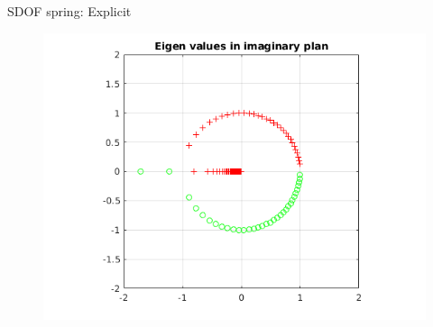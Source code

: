 \begin{frame}{SDOF spring: Explicit}
\begin{figure}[ht] 
  \label{ fig7} 
  \begin{minipage}[b]{0.5\linewidth}
    \centering
    \includegraphics[scale=.35]{images/sdof-exp-1.png} \\


\end{minipage}
\end{figure}
\end{frame}
